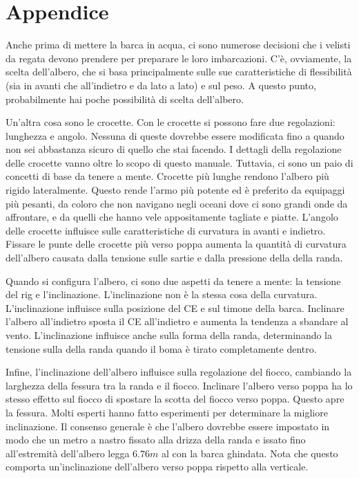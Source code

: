 
\chapter{Appendice}
\label{ch:appendice}
Anche prima di mettere la barca in acqua, ci sono numerose decisioni che i
velisti da regata devono prendere per preparare le loro imbarcazioni. C'è,
ovviamente, la scelta dell'albero, che si basa principalmente sulle sue
caratteristiche di flessibilità (sia in avanti che all'indietro e da lato a
lato) e sul peso. A questo punto, probabilmente hai poche possibilità di scelta
dell'albero.

Un'altra cosa sono le crocette. Con le crocette si possono fare due regolazioni:
lunghezza e angolo. Nessuna di queste dovrebbe essere modificata fino a quando
non sei abbastanza sicuro di quello che stai facendo. I dettagli della
regolazione delle crocette vanno oltre lo scopo di questo manuale. Tuttavia, ci
sono un paio di concetti di base da tenere a mente. Crocette più lunghe rendono
l'albero più rigido lateralmente. Questo rende l'armo più potente ed è
preferito da equipaggi più pesanti, da coloro che non navigano negli oceani dove
ci sono grandi onde da affrontare, e da quelli che hanno vele appositamente
tagliate e piatte. L'angolo delle crocette influisce sulle caratteristiche di
curvatura in avanti e indietro. Fissare le punte delle crocette più verso poppa
aumenta la quantità di curvatura dell'albero causata dalla tensione sulle sartie
e dalla pressione della \sheet della randa.

Quando si configura l'albero, ci sono due aspetti da tenere a mente: la tensione
del rig e l'inclinazione. L'inclinazione non è la stessa cosa della curvatura.
L'inclinazione influisce sulla posizione del \ac{CE} e sul timone della
barca. Inclinare l'albero all'indietro sposta il \ac{CE} all'indietro e aumenta la
tendenza a sbandare al vento. L'inclinazione influisce anche sulla forma della
randa, determinando la tensione sulla \sheet della randa quando il boma è tirato
completamente dentro.

Infine, l'inclinazione dell'albero influisce sulla regolazione del fiocco,
cambiando la larghezza della fessura tra la randa e il fiocco. Inclinare
l'albero verso poppa ha lo stesso effetto sul fiocco di spostare la scotta del
fiocco verso poppa. Questo apre la fessura. Molti esperti hanno fatto
esperimenti per determinare la migliore inclinazione. Il consenso generale è che
l'albero dovrebbe essere impostato in modo che un metro a nastro fissato alla
drizza della randa e issato fino all'estremità dell'albero legga $6.76\si{m}$ al
\transom con la barca ghindata.
%
Nota che questo comporta un'inclinazione dell'albero verso poppa rispetto alla
verticale.

